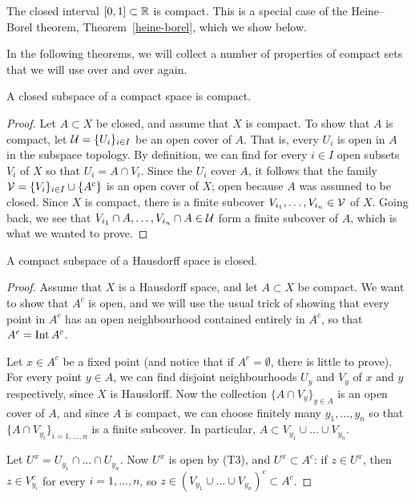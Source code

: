 \begin{example}
  \label{interval-compact}
  The closed interval $[0,1] \subset \mathbb{R}$ is compact. This is a special case of the Heine--Borel theorem, Theorem~\ref{heine-borel}, which we show below.
\end{example}
In the following theorems, we will collect a number of properties of compact sets that we will use over and over again.
\begin{thm}
  \label{closed-in-compact}
  A closed subspace of a compact space is compact.
\end{thm}
\begin{proof}
  Let $A \subset X$ be closed, and assume that $X$ is compact. To show that $A$ is compact, let $\mathcal{U} = \{U_i\}_{i \in I}$ be an open cover of $A$. That is, every $U_i$ is open in $A$ in the subspace topology. By definition, we can find for every $i \in I$ open subsets $V_i$ of $X$ so that $U_i = A \cap V_i$. Since the $U_i$ cover $A$, it follows that the family $\mathcal{V} = \{V_i\}_{i \in I} \cup \{A^c\}$ is an open cover of $X$; open because $A$ was assumed to be closed. Since $X$ is compact, there is a finite subcover $V_{i_1}, \dots, V_{i_n} \in \mathcal{V}$ of $X$. Going back, we see that $V_{i_1} \cap A, \dots, V_{i_n} \cap A \in \mathcal{U}$ form a finite subcover of $A$, which is what we wanted to prove.
\end{proof}
\begin{thm}
  \label{compact-in-Hausdorff}
  A compact subspace of a Hausdorff space is closed.
\end{thm}
\begin{proof}
  Assume that $X$ is a Hausdorff space, and let $A \subset X$ be compact. We want to show that $A^c$ is open, and we will use the usual trick of showing that every point in $A^c$ has an open neighbourhood contained entirely in $A^c$, so that $A^c = \operatorname{Int} A^c$.
  
  Let $x \in A^c$ be a fixed point (and notice that if $A^c = \emptyset$, there is little to prove). For every point $y \in A$, we can find disjoint neighbourhoods $U_y$ and $V_y$ of $x$ and $y$ respectively, since $X$ is Hausdorff. Now the collection $\{A \cap V_y\}_{y \in A}$ is an open cover of $A$, and since $A$ is compact, we can choose finitely many $y_1, \dots, y_n$ so that $\{A \cap V_{y_i}\}_{i=1,\dots,n}$ is a finite subcover. In particular, $A \subset V_{y_1} \cup \dots \cup V_{y_n}$.
  
  Let $U^x = U_{y_1} \cap \dots \cap U_{y_n}$. Now $U^x$ is open by (T3), and $U^x \subset A^c$: if $z \in U^x$, then $z \in V_{y_i}^c$ for every $i = 1, \dots, n$, so $z \in (V_{y_1} \cup \dots \cup V_{y_n})^c \subset A^c$.
\end{proof}
